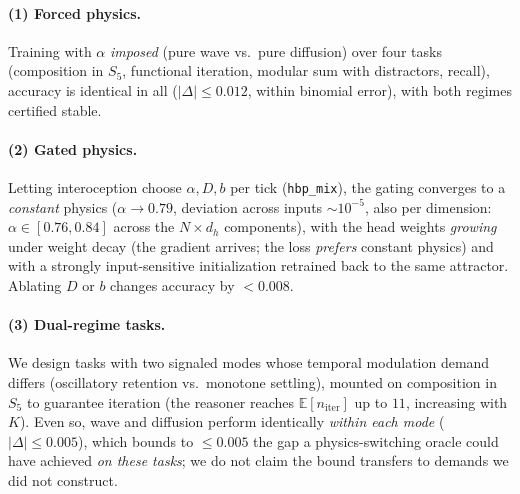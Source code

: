 \documentclass{article}
\begin{document}
\paragraph{(1) Forced physics.} Training with $\alpha$ \emph{imposed} (pure wave
vs.\ pure diffusion) over four tasks (composition in $S_5$, functional
iteration, modular sum with distractors, recall), accuracy is identical in all
($|\Delta|\le0.012$, within binomial error), with both regimes certified stable.

\paragraph{(2) Gated physics.} Letting interoception choose $\alpha,D,b$ per tick
(\texttt{hbp\_mix}), the gating converges to a \emph{constant} physics
($\alpha\to0.79$, deviation across inputs $\sim10^{-5}$, also per dimension:
$\alpha\in[0.76,0.84]$ across the $N{\times}d_h$ components), with the head
weights \emph{growing} under weight decay (the gradient arrives; the loss
\emph{prefers} constant physics) and with a strongly input-sensitive
initialization retrained back to the same attractor. Ablating $D$ or $b$ changes
accuracy by $<0.008$.

\paragraph{(3) Dual-regime tasks.} We design tasks with two signaled modes whose
temporal modulation demand differs (oscillatory retention vs.\ monotone
settling), mounted on composition in $S_5$ to guarantee iteration (the reasoner
reaches $\mathbb{E}[n_{\mathrm{iter}}]$ up to $11$, increasing with $K$). Even so,
wave and diffusion perform identically \emph{within each mode}
($|\Delta|\le0.005$), which bounds to $\le0.005$ the gap a physics-switching
oracle could have achieved \emph{on these tasks}; we do not claim the bound
transfers to demands we did not construct.
\end{document}

